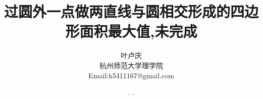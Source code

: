 \documentclass[a4paper, 12pt]{article} %
\makeatletter
\renewcommand{\maketitle}{ %
  \renewcommand\refname{参考文献}
  \newcommand{\D}{\displaystyle}\newcommand{\ri}{\Rightarrow}
  \newcommand{\ds}{\displaystyle} \renewcommand{\ni}{\noindent}
  \newcommand{\pa}{\partial} \newcommand{\Om}{\Omega}
  \newcommand{\om}{\omega} \newcommand{\sik}{\sum_{i=1}^k}
  \newcommand{\vov}{\Vert\omega\Vert} \newcommand{\Umy}{U_{\mu_i,y^i}}
  \newcommand{\lamns}{\lambda_n^{^{\scriptstyle\sigma}}}
  \newcommand{\chiomn}{\chi_{_{\Omega_n}}}
  \newcommand{\ullim}{\underline{\lim}} \newcommand{\bsy}{\boldsymbol}
  \newcommand{\mvb}{\mathversion{bold}} \newcommand{\la}{\lambda}
  \newcommand{\La}{\Lambda} \newcommand{\va}{\varepsilon}
  \newcommand{\be}{\beta} \newcommand{\al}{\alpha}
  \newcommand{\dis}{\displaystyle} \newcommand{\R}{{\mathbb R}}
  \newcommand{\N}{{\mathbb N}} \newcommand{\cF}{{\mathcal F}}
  \newcommand{\gB}{{\mathfrak B}} \newcommand{\eps}{\epsilon}
  \begin{flushright} %
    {\LARGE\@title} %
    
    \vspace{50pt} %
    
    {\large\@author} %
    \\\@date %
    
    \vspace{40pt} %
  \end{flushright}
}
\makeatother
\begin{document}
\title{\textbf{过圆外一点做两直线与圆相交形成的四边形面积最大值,未完成}} 
\author{\small{叶卢庆}\\{\small{杭州师范大学理学院}}\\{\small{Email:h5411167@gmail.com}}} %
\renewcommand{\today}{\number\year. \number\month. \number\day}
\date{\today} %



\maketitle %






\end{document}

